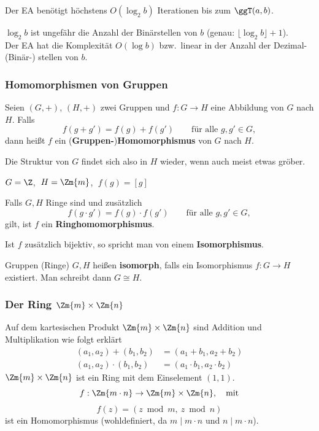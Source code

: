 \begin{satz}
Der EA benötigt höchstens $O(\log_2 b)$ Iterationen bis zum $\ggT(a, b)$.
\end{satz}

$\log_2 b$ ist ungefähr die Anzahl der Binärstellen von $b$ (genau: $\lfloor \log_2 b \rfloor + 1$).\\
Der EA hat die Komplexität $O(\log b)$ bzw.\ linear in der Anzahl der Dezimal- (Binär-) stellen von $b$.

\subsubsection*{Homomorphismen von Gruppen}

\begin{definition}
Seien $(G,+)$, $(H,+)$ zwei Gruppen und $f : G \to H$ eine Abbildung von $G$ nach $H$. Falls
\[ f(g + g') = f(g) + f(g') \qquad \text{für alle } g, g' \in G, \]
dann heißt $f$ ein (\textbf{Gruppen-})\textbf{Homomorphismus} von $G$ nach $H$.
\end{definition}

Die Struktur von $G$ findet sich also in $H$ wieder, wenn auch meist etwas gröber.

\begin{beispiel}
$G = \Z$, $\;H = \Zm{m}$, $\;f(g) = [g]$
\end{beispiel}

\begin{definition}
Falls $G, H$ Ringe sind und zusätzlich
\[ f(g \cdot g') = f(g) \cdot f(g') \qquad \text{für alle } g, g' \in G, \]
gilt, ist $f$ ein \textbf{Ringhomomorphismus}.

Ist $f$ zusätzlich bijektiv, so spricht man von einem \textbf{Isomorphismus}.

Gruppen (Ringe) $G, H$ heißen \textbf{isomorph}, falls ein Isomorphismus $f : G \to H$ existiert. Man schreibt dann $G \cong H$.
\end{definition}

\subsubsection*{Der Ring $\Zm{m} \times \Zm{n}$}

Auf dem kartesischen Produkt $\Zm{m} \times \Zm{n}$ sind Addition und Multiplikation wie folgt erklärt
\begin{align*}
(a_1, a_2) + (b_1, b_2) &= (a_1 + b_1, a_2 + b_2) \\
(a_1, a_2) \cdot (b_1, b_2) &= (a_1 \cdot b_1, a_2 \cdot b_2)
\end{align*}
$\Zm{m} \times \Zm{n}$ ist ein Ring mit dem Einselement $(1, 1)$.
\[ f : \Zm{m \cdot n} \to \Zm{m} \times \Zm{n}, \quad \text{mit} \]
\[ f(z) = (z \bmod m,\ z \bmod n) \]
ist ein Homomorphismus (wohldefiniert, da $m \mid m \cdot n$ und $n \mid m \cdot n$).

